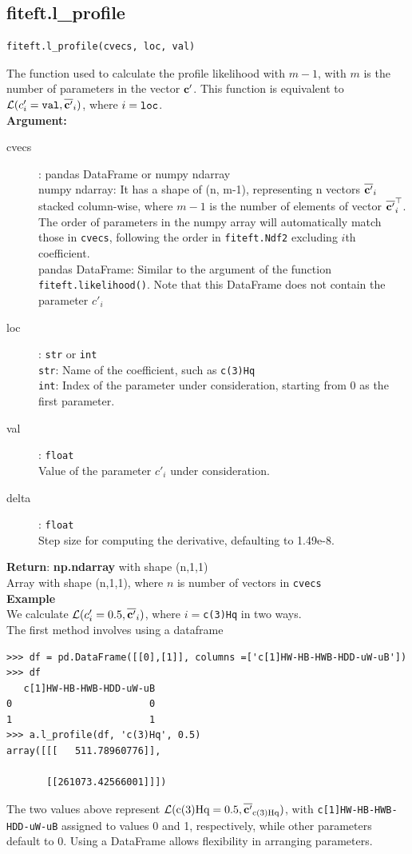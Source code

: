 \documentclass[12pt]{article}
\def\b#1{\boldsymbol{\rm #1}}
\begin{document}
\subsection{fiteft.l\_profile}
\begin{verbatim}
fiteft.l_profile(cvecs, loc, val)
\end{verbatim}
The function used to calculate the profile likelihood with $m-1$, with $m$ is the number of parameters in the vector $\b c'$. This function is equivalent to $\mathcal{L}(c'_i= \verb|val|,\overline{\b c'}_i) $, where $i =\verb|loc|$. \\[1cm]
\textbf{Argument:}
\begin{description}
  \item[cvecs]: pandas DataFrame or numpy ndarray\\
  numpy ndarray: It has a shape of (n, m-1), representing n vectors $\overline{\b c'}_i$ stacked column-wise, where $m-1$ is the number of elements of vector $\overline{\b c'}_i^\top$. The order of parameters in the numpy array will automatically match those in \verb|cvecs|, following the order in \verb|fiteft.Ndf2| excluding $i$th coefficient.\\
  pandas DataFrame: Similar to the argument of the function \verb|fiteft.likelihood()|. Note that this DataFrame does not contain the parameter $c'_i$
  \item[loc]: \verb|str| or \verb|int| \\
  \verb|str|: Name of the coefficient, such as \verb|c(3)Hq|\\
  \verb|int|: Index of the parameter under consideration, starting from 0 as the first parameter.
  \item[val]: \verb|float| \\
  Value of the parameter $c'_i$ under consideration.
  \item[delta]: \verb|float| \\
  Step size for computing the derivative, defaulting to 1.49e-8.
 \end{description}
 \textbf{Return}: \textbf{np.ndarray} with shape (n,1,1)\\
 \indent Array with shape (n,1,1), where $n$ is number of vectors in \verb|cvecs|
 \\[1cm]
 \textbf{Example}\\
We calculate $\mathcal{L}(c'_i=0.5,\overline{\b c'}_i)$, where $i=$\verb|c(3)Hq| in two ways.\\
The first method involves using a dataframe
\begin{verbatim}
>>> df = pd.DataFrame([[0],[1]], columns =['c[1]HW-HB-HWB-HDD-uW-uB'])
>>> df
   c[1]HW-HB-HWB-HDD-uW-uB
0                        0
1                        1
>>> a.l_profile(df, 'c(3)Hq', 0.5)
array([[[   511.78960776]],

       [[261073.42566001]]])
\end{verbatim}
The two values above represent $\mathcal{L}(\rm c(3)Hq=0.5,\overline{\b c'}_{c(3)Hq})$, with \verb|c[1]HW-HB-HWB-HDD-uW-uB| assigned to values 0 and 1, respectively, while other parameters default to 0. Using a DataFrame allows flexibility in arranging parameters.
\end{document}
